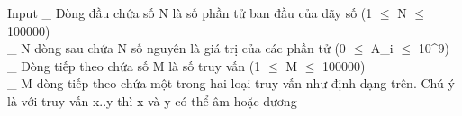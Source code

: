 Input
\_ Dòng đầu chứa số N là số phần tử ban đầu của dãy số (1 $\le$ N $\le$ 100000)   
\\   \_ N dòng sau chứa N số nguyên là giá trị của các phần tử (0 $\le$ A\_i $\le$ 10^9)   
\\   \_ Dòng tiếp theo chứa số M là số truy vấn (1 $\le$ M $\le$ 100000)   
\\   \_ M dòng tiếp theo chứa một trong hai loại truy vấn như định dạng trên. Chú ý là với truy vấn x..y thì x và y có thể âm hoặc dương   
\\